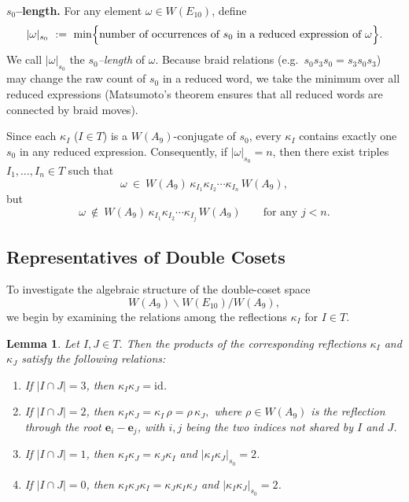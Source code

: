 \documentclass[11pt]{amsart}
\numberwithin{equation}{section}
\newtheorem{lem}[thm]{Lemma}
\newcommand{\vve}{\mathbf{e}}
\begin{document}
\medskip
\noindent
\textbf{$s_0$--length.}
For any element $\omega\in W(E_{10})$, define
\[
|\omega|_{s_0}
\ :=\
\min\Bigl\{\text{number of occurrences of }s_0
\text{ in a reduced expression of }\omega\Bigr\}.
\]
We call $|\omega|_{s_0}$ the \emph{$s_0$--length} of $\omega$.
Because braid relations (e.g.\ $s_0s_3s_0=s_3s_0s_3$) may change the raw
count of $s_0$ in a reduced word, we take the minimum over all
reduced expressions (Matsumoto's theorem ensures that all reduced words
are connected by braid moves).

Since each $\kappa_I$ ($I\in T$) is a $W(A_9)$-conjugate of $s_0$, every
$\kappa_I$ contains exactly one $s_0$ in any reduced expression.
Consequently, if $|\omega|_{s_0}=n$, then there exist triples
$I_1,\dots,I_n\in T$ such that
\[
\omega \ \in\ W(A_9)\,\kappa_{I_1}\kappa_{I_2}\cdots\kappa_{I_n}\,W(A_9),
\]
but
\[
\omega\ \notin\ W(A_9)\,\kappa_{I_1}\kappa_{I_2}\cdots\kappa_{I_j}\,W(A_9)
\qquad\text{for any } j<n.
\]



\medskip
\noindent
\subsection{Representatives of Double Cosets}\label{SS:Dcoset}
To investigate the algebraic structure of the double-coset space
\[
W(A_9)\backslash W(E_{10})/W(A_9),
\]
we begin by examining the relations among the reflections
\(\kappa_I\) for \(I\in T\).

\begin{lem}\label{L:kappa-relations}
Let \(I,J\in T\). Then the products of the corresponding reflections 
\(\kappa_I\) and \(\kappa_J\) satisfy the following relations:
\begin{enumerate}
\item If \(|I\cap J|=3\), then \(\kappa_I\kappa_J = \mathrm{id}\).
\item If \(|I\cap J|=2\), then 
\(\kappa_I\kappa_J =\kappa_I\,\rho= \rho\,\kappa_J,\)
where \(\rho\in W(A_9)\) is the reflection through the root 
\(\vve_i - \vve_j\), with \(i,j\) being the two indices not shared by \(I\) and \(J\).
\item If \(|I\cap J|=1\), then 
\(\kappa_I\kappa_J = \kappa_J\kappa_I\)
and \(|\kappa_I\kappa_J|_{s_0}=2\).
\item If \(|I\cap J|=0\), then 
\(\kappa_I\kappa_J\kappa_I = \kappa_J\kappa_I\kappa_J\)
and \(|\kappa_I\kappa_J|_{s_0}=2\).
\end{enumerate}
\end{lem}
\end{document}
